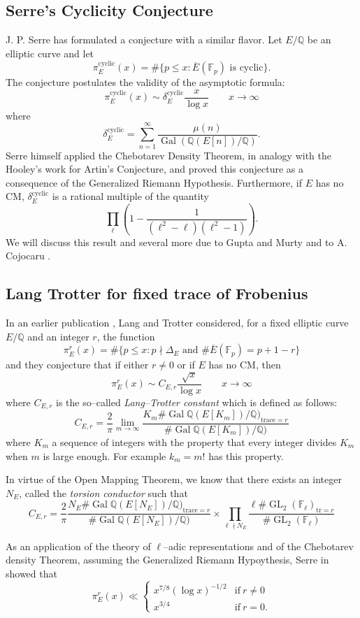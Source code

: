 \documentclass[a4paper,10pt]{article}
\newcommand{\F}{\mathbb{F}}
\newcommand{\Q}{\mathbb{Q}}
\begin{document}
\subsection{Serre's Cyclicity Conjecture}
J. P. Serre has formulated a conjecture with a similar flavor. Let $E/\Q$ be an elliptic curve and let 
$$\pi_E^{\text{cyclic}}(x)=\#\{p\le x:\overline E(\F_p)\text{ is cyclic}\}.$$
The conjecture postulates the validity of the asymptotic formula:
$$\pi_E^{\text{cyclic}}(x)\sim\delta_E^{\text{cyclic}}\frac x{\log x}\qquad x\rightarrow\infty$$
where 
$$\delta_E^{\text{cyclic}}=\sum_{n=1}^\infty\frac{\mu(n)}{\operatorname{Gal}(\Q(E[n])/\Q)}.$$
Serre himself applied the Chebotarev Density Theorem, in analogy with the Hooley's work for Artin's Conjecture, 
and proved this conjecture as a consequence of the Generalized Riemann Hypothesis.
Furthermore, if $E$ has no CM,  $\delta_E^{\text{cyclic}}$ is a rational multiple of the quantity
$$\prod_\ell\left(1-\frac{1}{(\ell^2-\ell)(\ell^2-1)}\right).$$
We will discuss this result and several more due to Gupta and Murty \cite{GM2} and to A. Cojocaru \cite{C}.
 
\subsection{Lang Trotter for fixed trace of Frobenius}
In an earlier publication \cite{LT2}, Lang and Trotter considered, for  a fixed elliptic curve $E/\Q$ and an integer $r$, the function
$$\pi_E^r(x)=\#\{p\le x: p\nmid\Delta_E\text{ and } \#\overline E(\F_p)=p+1-r\}$$
and they conjecture that if either $r\ne0$ or if $E$ has no CM, then
$$\pi_E^r(x)\sim C_{E,r}\frac{\sqrt{x}}{\log x}\qquad x\rightarrow\infty$$
where $C_{E,r}$ is the so--called \emph{Lang--Trotter constant} which is defined as follows:
$$C_{E,r}=\frac2\pi\lim_{m\rightarrow\infty}\frac{K_m\#\operatorname{Gal}\Q(E[K_m])/\Q)_{\text{trace}=r}}{\#\operatorname{Gal}\Q(E[K_m])/\Q)}$$
where $K_m$ a sequence of integers with the property that every integer divides $K_m$ when $m$ is large enough. For example $k_m=m!$  
has this property.

In virtue of the Open Mapping Theorem, we know that there exists an integer $N_E$, called the \emph{torsion conductor} such that 
$$C_{E,r}=\frac2\pi\frac{N_E\#\operatorname{Gal}\Q(E[N_E])/\Q)_{\text{trace}=r}}{\#\operatorname{Gal}\Q(E[N_E])/\Q)}
\times\prod_{\ell\nmid N_E}\frac{\ell\#\operatorname{GL}_2(\F_\ell)_{\text{tr}=r}}{\#\operatorname{GL}_2(\F_\ell)} $$
 
 
As an application of the theory of $\ell$--adic representations and of the Chebotarev density Theorem, assuming the Generalized Riemann 
Hypoythesis, Serre in \cite{S3} showed that
$$\pi_E^r(x)\ll\begin{cases} x^{7/8}(\log x)^{-1/2}&\text{if}\ r\ne0\\ x^{3/4}&\text{if}\ r=0.\end{cases}$$  
\end{document}
